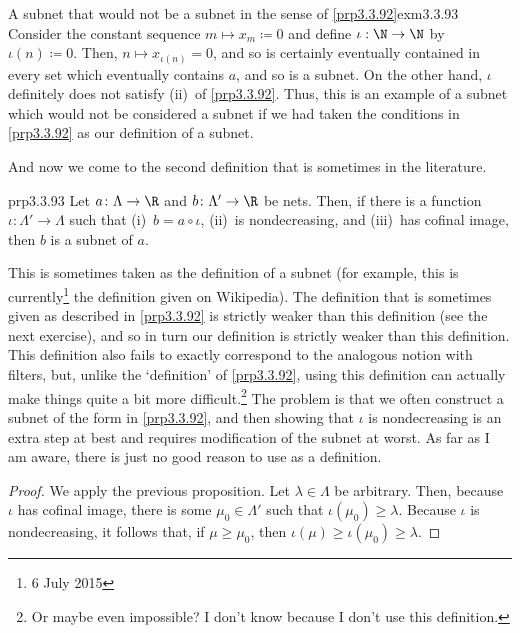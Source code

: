 \begin{exm}{A subnet that would not be a subnet in the sense of \cref{prp3.3.92}}{exm3.3.93}
Consider the constant sequence $m\mapsto x_m\coloneqq 0$ and define $\iota :\N \rightarrow \N$ by $\iota (n)\coloneqq 0$.  Then, $n\mapsto x_{\iota (n)}=0$, and so is certainly eventually contained in every set which eventually contains $a$, and so is a subnet.  On the other hand, $\iota$ definitely does not satisfy (ii)~of \cref{prp3.3.92}.  Thus, this is an example of a subnet which would not be considered a subnet if we had taken the conditions in \cref{prp3.3.92} as our definition of a subnet.
\end{exm}
And now we come to the second definition that is sometimes in the literature.
\begin{prp}{}{prp3.3.93}
Let $a\colon \Lambda \rightarrow \R$ and $b\colon \Lambda '\rightarrow \R$ be nets.  Then, if there is a function $\iota \colon \Lambda '\rightarrow \Lambda$ such that (i)~$b=a\circ \iota$, (ii)~is nondecreasing, and (iii)~has cofinal image, then $b$ is a subnet of $a$.
\begin{rmk}
This is sometimes taken as the definition of a subnet (for example, this is currently\footnote{6 July 2015} the definition given on Wikipedia).  The definition that is sometimes given as described in \cref{prp3.3.92} is strictly weaker than this definition (see the next exercise), and so in turn our definition is strictly weaker than this definition.  This definition also fails to exactly correspond to the analogous notion with filters, but, unlike the `definition' of \cref{prp3.3.92}, using this definition can actually make things quite a bit more difficult.\footnote{Or maybe even impossible?  I don't know because I don't use this definition.}  The problem is that we often construct a subnet of the form in \cref{prp3.3.92}, and then showing that $\iota$ is nondecreasing is an extra step at best and requires modification of the subnet at worst.  As far as I am aware, there is just no good reason to use as a definition.
\end{rmk}
\begin{proof}
We apply the previous proposition.  Let $\lambda \in \Lambda$ be arbitrary.  Then, because $\iota$ has cofinal image, there is some $\mu _0\in \Lambda '$ such that $\iota (\mu _0)\geq \lambda$.  Because $\iota$ is nondecreasing, it follows that, if $\mu \geq \mu _0$, then $\iota (\mu )\geq \iota (\mu _0)\geq \lambda$.
\end{proof}
\end{prp}
